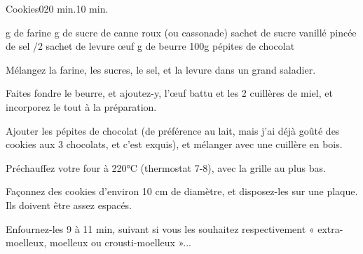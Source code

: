 \begin{recette}{Cookies}{0}{20 min.}{10 min.}
\begin{ingredients}[15 cookies]
 g de farine
 g de sucre de canne roux (ou cassonade)
 sachet de sucre vanillé
 pincée de sel
/2 sachet de levure
 œuf
 g de beurre
\ingredient 100g pépites de chocolat
\end{ingredients}

\begin{preparation}
\etape Mélangez la farine, les sucres, le sel, et la levure dans un grand saladier.

\etape Faites fondre le beurre, et ajoutez-y, l'œuf battu et les 2 cuillères de miel, et incorporez le tout à la préparation.

\etape Ajouter les pépites de chocolat (de préférence au lait, mais j'ai déjà goûté des cookies aux 3 chocolats, et c'est exquis), et mélanger avec une cuillère en bois.

\etape Préchauffez votre four à 220°C (thermostat 7-8), avec la grille au plus bas.

\etape Façonnez des cookies d’environ 10 cm de diamètre, et disposez-les sur une plaque. Ils doivent être assez espacés.
\end{preparation}

\begin{cuisson}
Enfournez-les 9 à 11 min, suivant si vous les souhaitez respectivement « extra-moelleux, moelleux ou crousti-moelleux »... 
\end{cuisson}
\end{recette}

